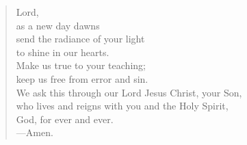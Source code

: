 \prayer

\setlength{\vleftmargin}{\prayerleftmargini}

\begin{verse}
Lord,\\
as a new day dawns\\
send the radiance of your light\\
to shine in our hearts.\\
Make us true to your teaching;\\
keep us free from error and sin.\\
We ask this through our Lord Jesus Christ, your Son,\\
who lives and reigns with you and the Holy Spirit,\\
God, for ever and ever.\\
{\color{red}---\thinspace}Amen.
\end{verse}

\setlength{\vleftmargin}{\defleftmargini}